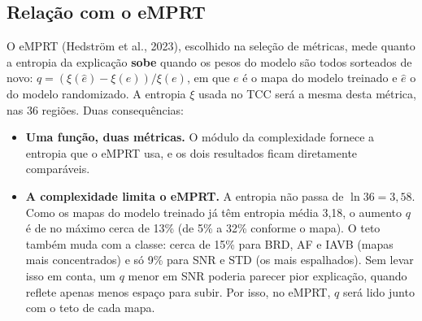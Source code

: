 \documentclass[11pt,a4paper]{article}
\begin{document}
\subsection{Relação com o eMPRT}\label{sec:emprt}
O eMPRT (Hedström et al., 2023), escolhido na seleção de métricas, mede quanto a entropia da explicação \textbf{sobe} quando os pesos do modelo são todos sorteados de novo: $q = (\xi(\hat{e}) - \xi(e))/\xi(e)$, em que $e$ é o mapa do modelo treinado e $\hat{e}$ o do modelo randomizado. A entropia $\xi$ usada no TCC será a mesma desta métrica, nas 36 regiões. Duas consequências:
\begin{itemize}
\item \textbf{Uma função, duas métricas.} O módulo da complexidade fornece a entropia que o eMPRT usa, e os dois resultados ficam diretamente comparáveis.
\item \textbf{A complexidade limita o eMPRT.} A entropia não passa de $\ln 36 = 3{,}58$. Como os mapas do modelo treinado já têm entropia média 3,18, o aumento $q$ é de no máximo cerca de 13\% (de 5\% a 32\% conforme o mapa). O teto também muda com a classe: cerca de 15\% para BRD, AF e IAVB (mapas mais concentrados) e só 9\% para SNR e STD (os mais espalhados). Sem levar isso em conta, um $q$ menor em SNR poderia parecer pior explicação, quando reflete apenas menos espaço para subir. Por isso, no eMPRT, $q$ será lido junto com o teto de cada mapa.
\end{itemize}
\end{document}
